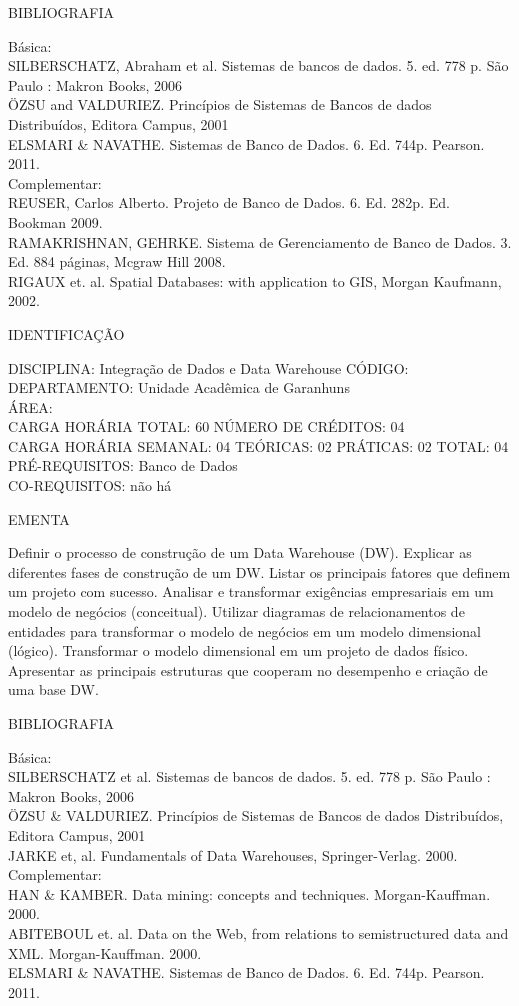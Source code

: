 \documentclass[
	12pt,				%
	openright,			%
  oneside,     %
	a4paper,			%
	english,			%
	french,				%
	spanish,			%
	brazil				%
	]{abntex2}
\begin{document}
\begin{apendicesenv}
BIBLIOGRAFIA 

Básica:\\
SILBERSCHATZ, Abraham et al. Sistemas de bancos de dados. 5. ed. 778 p.
São Paulo : Makron Books, 2006\\
ÖZSU and VALDURIEZ. Princípios de Sistemas de Bancos de dados
Distribuídos, Editora Campus, 2001\\
ELSMARI \& NAVATHE. Sistemas de Banco de Dados. 6. Ed. 744p. Pearson.
2011.\\
Complementar:\\
REUSER, Carlos Alberto. Projeto de Banco de Dados. 6. Ed. 282p. Ed.
Bookman 2009.\\
RAMAKRISHNAN, GEHRKE. Sistema de Gerenciamento de Banco de Dados. 3. Ed.
884 páginas, Mcgraw Hill 2008.\\
RIGAUX et. al. Spatial Databases: with application to GIS, Morgan
Kaufmann, 2002.\

\newpage IDENTIFICAÇÃO

DISCIPLINA: Integração de Dados e Data Warehouse CÓDIGO:\\
DEPARTAMENTO: Unidade Acadêmica de Garanhuns\\
ÁREA: \\
CARGA HORÁRIA TOTAL: 60 NÚMERO DE CRÉDITOS: 04\\
CARGA HORÁRIA SEMANAL: 04 TEÓRICAS: 02 PRÁTICAS: 02 TOTAL: 04\\
PRÉ-REQUISITOS: Banco de Dados\\
CO-REQUISITOS: não há

EMENTA 

Definir o processo de construção de um Data Warehouse (DW). Explicar as
diferentes fases de construção de um DW. Listar os principais fatores
que definem um projeto com sucesso. Analisar e transformar exigências
empresariais em um modelo de negócios (conceitual). Utilizar diagramas
de relacionamentos de entidades para transformar o modelo de negócios
em um modelo dimensional (lógico). Transformar o modelo dimensional em
um projeto de dados físico. Apresentar as principais estruturas que
cooperam no desempenho e criação de uma base DW.

BIBLIOGRAFIA 

Básica:\\
SILBERSCHATZ et al. Sistemas de bancos de dados. 5. ed. 778 p. São Paulo
: Makron Books, 2006\\
ÖZSU \& VALDURIEZ. Princípios de Sistemas de Bancos de dados
Distribuídos, Editora Campus, 2001\\
JARKE et, al. Fundamentals of Data Warehouses, Springer-Verlag. 2000.\\
Complementar:\\
HAN \& KAMBER. Data mining: concepts and techniques. Morgan-Kauffman.
2000.\\
ABITEBOUL et. al. Data on the Web, from relations to semistructured data
and XML. Morgan-Kauffman. 2000.\\
ELSMARI \& NAVATHE. Sistemas de Banco de Dados. 6. Ed. 744p. Pearson.
2011.


\end{apendicesenv}
\end{document}
